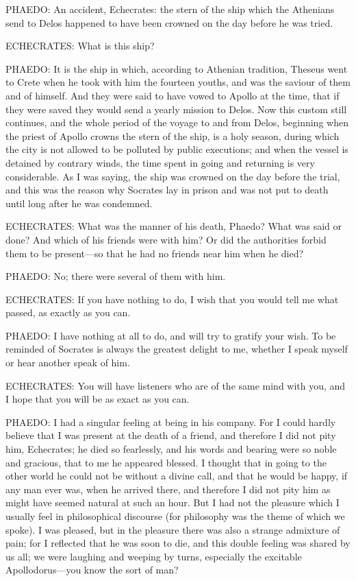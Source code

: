 PHAEDO: An accident, Echecrates: the stern of the ship which the Athenians
send to Delos happened to have been crowned on the day before he was
tried.

ECHECRATES: What is this ship?

PHAEDO: It is the ship in which, according to Athenian tradition, Theseus
went to Crete when he took with him the fourteen youths, and was the
saviour of them and of himself. And they were said to have vowed to Apollo
at the time, that if they were saved they would send a yearly mission to
Delos. Now this custom still continues, and the whole period of the voyage
to and from Delos, beginning when the priest of Apollo crowns the stern of
the ship, is a holy season, during which the city is not allowed to be
polluted by public executions; and when the vessel is detained by contrary
winds, the time spent in going and returning is very considerable. As I
was saying, the ship was crowned on the day before the trial, and this was
the reason why Socrates lay in prison and was not put to death until long
after he was condemned.

ECHECRATES: What was the manner of his death, Phaedo? What was said or
done? And which of his friends were with him? Or did the authorities
forbid them to be present—so that he had no friends near him when he
died?

PHAEDO: No; there were several of them with him.

ECHECRATES: If you have nothing to do, I wish that you would tell me what
passed, as exactly as you can.

PHAEDO: I have nothing at all to do, and will try to gratify your wish. To
be reminded of Socrates is always the greatest delight to me, whether I
speak myself or hear another speak of him.

ECHECRATES: You will have listeners who are of the same mind with you, and
I hope that you will be as exact as you can.

PHAEDO: I had a singular feeling at being in his company. For I could
hardly believe that I was present at the death of a friend, and therefore
I did not pity him, Echecrates; he died so fearlessly, and his words and
bearing were so noble and gracious, that to me he appeared blessed. I
thought that in going to the other world he could not be without a divine
call, and that he would be happy, if any man ever was, when he arrived
there, and therefore I did not pity him as might have seemed natural at
such an hour. But I had not the pleasure which I usually feel in
philosophical discourse (for philosophy was the theme of which we spoke).
I was pleased, but in the pleasure there was also a strange admixture of
pain; for I reflected that he was soon to die, and this double feeling was
shared by us all; we were laughing and weeping by turns, especially the
excitable Apollodorus—you know the sort of man?

